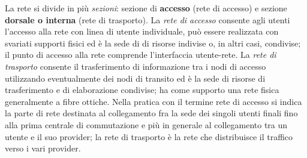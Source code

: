 La rete si divide in più \textit{sezioni}: sezione di \textbf{accesso} (rete di accesso) e sezione \textbf{dorsale o interna} (rete di trasporto). La \textit{rete di accesso} consente agli utenti l'accesso alla rete con linea di utente individuale, può essere realizzata con svariati supporti fisici ed è la sede di di risorse indivise o, in altri casi, condivise; il punto di accesso alla rete comprende l'interfaccia utente-rete. La \textit{rete di trasporto} consente il trasferimento di informazione tra i nodi di accesso utilizzando eventualmente dei nodi di transito ed è la sede di risorse di trasferimento e di elaborazione condivise; ha come supporto una rete fisica generalmente a fibre ottiche. Nella pratica con il termine rete di accesso si indica la parte di rete destinata al collegamento fra la sede dei singoli utenti finali fino alla prima centrale di commutazione e più in generale al collegamento tra un utente e il suo provider; la rete di trasporto è la rete che distribuisce il traffico verso i vari provider.

